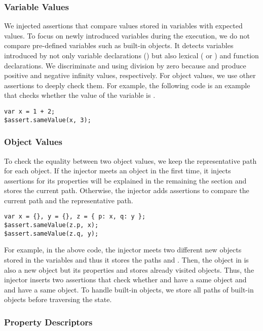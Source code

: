 \subsubsection{Variable Values}

We injected assertions that compare values stored in variables with expected
values.  To focus on newly introduced variables during the execution, we do not
compare pre-defined variables such as built-in objects.  It detects variables
introduced by not only variable declarations () but also lexical
( or ) and function declarations.  We discriminate
 and  using division by zero because  and
 produce positive and negative infinity values, respectively.  For
object values, we use other assertions to deeply check them.  For example, the
following code is an example that checks whether the value of the variable
 is .
\begin{lstlisting}[style=myJSstyle]
var x = 1 + 2;
$assert.sameValue(x, 3);
\end{lstlisting}


\subsubsection{Object Values}

To check the equality between two object values, we keep the representative path
for each object.  If the injector meets an object in the first time, it injects
assertions for its properties will be explained in the remaining the section and
stores the current path.  Otherwise, the injector adds assertions to compare the
current path and the representative path.
\begin{lstlisting}[style=myJSstyle]
var x = {}, y = {}, z = { p: x, q: y };
$assert.sameValue(z.p, x);
$assert.sameValue(z.q, y);
\end{lstlisting}
For example, in the above code, the injector meets two different new objects
stored in the variables  and  thus it stores the paths 
and .  Then, the object in  is also a new object but its
properties  and  stores already visited objects.  Thus, the
injector inserts two assertions that check whether  and  have
a same object and  and  have a same object.  To handle
built-in objects, we store all paths of built-in objects before traversing the
state.


\subsubsection{Property Descriptors}

